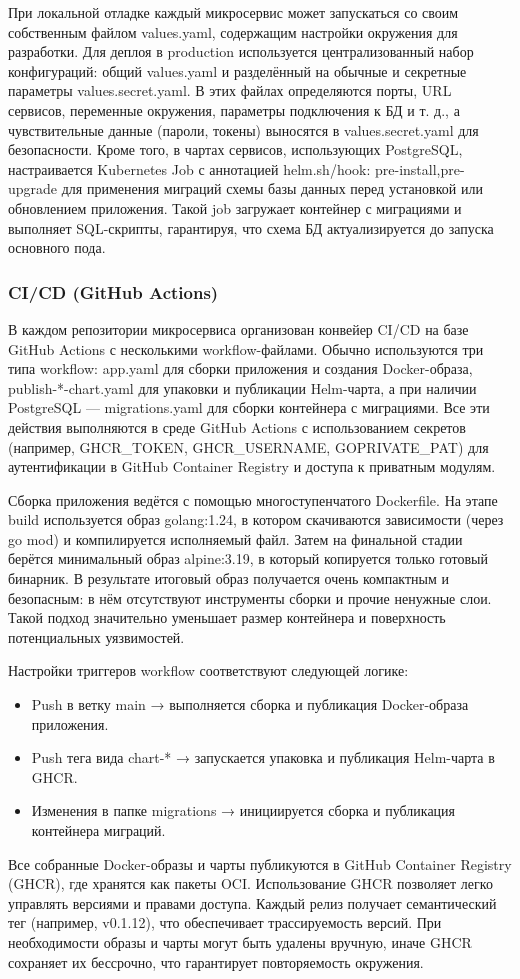 При локальной отладке каждый микросервис может запускаться со своим собственным файлом values.yaml, содержащим настройки окружения для разработки. Для деплоя в production используется централизованный набор конфигураций: общий values.yaml и разделённый на обычные и секретные параметры values.secret.yaml. В этих файлах определяются порты, URL сервисов, переменные окружения, параметры подключения к БД и т. д., а чувствительные данные (пароли, токены) выносятся в values.secret.yaml для безопасности. Кроме того, в чартах сервисов, использующих PostgreSQL, настраивается Kubernetes Job с аннотацией helm.sh/hook: pre-install,pre-upgrade для применения миграций схемы базы данных перед установкой или обновлением приложения. Такой job загружает контейнер с миграциями и выполняет SQL-скрипты, гарантируя, что схема БД актуализируется до запуска основного пода.

\subsubsection*{CI/CD (GitHub Actions)}
В каждом репозитории микросервиса организован конвейер CI/CD на базе GitHub Actions с несколькими workflow-файлами. Обычно используются три типа workflow: app.yaml для сборки приложения и создания Docker-образа, publish-*-chart.yaml для упаковки и публикации Helm-чарта, а при наличии PostgreSQL — migrations.yaml для сборки контейнера с миграциями. Все эти действия выполняются в среде GitHub Actions с использованием секретов (например, GHCR\_TOKEN, GHCR\_USERNAME, GOPRIVATE\_PAT) для аутентификации в GitHub Container Registry и доступа к приватным модулям.

Сборка приложения ведётся с помощью многоступенчатого Dockerfile. На этапе build используется образ golang:1.24, в котором скачиваются зависимости (через go mod) и компилируется исполняемый файл. Затем на финальной стадии берётся минимальный образ alpine:3.19, в который копируется только готовый бинарник. В результате итоговый образ получается очень компактным и безопасным: в нём отсутствуют инструменты сборки и прочие ненужные слои. Такой подход значительно уменьшает размер контейнера и поверхность потенциальных уязвимостей.

Настройки триггеров workflow соответствуют следующей логике:
\begin{itemize}
    \item Push в ветку main → выполняется сборка и публикация Docker-образа приложения.
    \item Push тега вида chart-* → запускается упаковка и публикация Helm-чарта в GHCR.
    \item Изменения в папке migrations → инициируется сборка и публикация контейнера миграций.
\end{itemize}
\noindent Все собранные Docker-образы и чарты публикуются в GitHub Container Registry (GHCR), где хранятся как пакеты OCI. Использование GHCR позволяет легко управлять версиями и правами доступа. Каждый релиз получает семантический тег (например, v0.1.12), что обеспечивает трассируемость версий. При необходимости образы и чарты могут быть удалены вручную, иначе GHCR сохраняет их бессрочно, что гарантирует повторяемость окружения.

